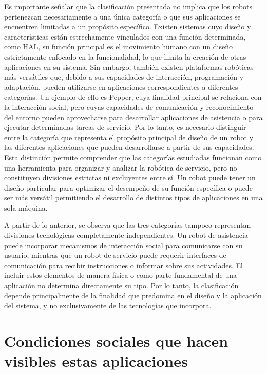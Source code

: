 \documentclass[11pt,a4paper]{article}
\begin{document}
Es importante señalar que la clasificación presentada no implica que los robots pertenezcan necesariamente a una única categoría o que sus aplicaciones se encuentren limitadas a un propósito específico. Existen sistemas cuyo diseño y características están estrechamente vinculados con una función determinada, como HAL, su función principal es el movimiento humano con un diseño estrictamente enfocado en la funcionalidad, lo que limita la creación de otras aplicaciones en su sistema.\cite{hal}  Sin embargo, también existen plataformas robóticas más versátiles que, debido a sus capacidades de interacción, programación y adaptación, pueden utilizarse en aplicaciones correspondientes a diferentes categorías. Un ejemplo de ello es Pepper, cuya finalidad principal se relaciona con la interacción social, pero cuyas capacidades de comunicación y reconocimiento del entorno pueden aprovecharse para desarrollar aplicaciones de asistencia o para ejecutar determinadas tareas de servicio.\cite{pepper}  Por lo tanto, es necesario distinguir entre la categoría que representa el propósito principal de diseño de un robot y las diferentes aplicaciones que pueden desarrollarse a partir de sus capacidades. Esta distinción permite comprender que las categorías estudiadas funcionan como una herramienta para organizar y analizar la robótica de servicio, pero no constituyen divisiones estrictas ni excluyentes entre sí. Un robot puede tener un diseño particular para optimizar el desempeño de su función específica o puede ser más versátil permitiendo el desarrollo de distintos tipos de aplicaciones en una sola máquina.

A partir de lo anterior, se observa que las tres categorías tampoco representan divisiones tecnológicas completamente independientes. Un robot de asistencia puede incorporar mecanismos de interacción social para comunicarse con su usuario, mientras que un robot de servicio puede requerir interfaces de comunicación para recibir instrucciones o informar sobre sus actividades. El incluir estos elementos de manera física o como parte fundamental de una aplicación no determina directamente su tipo. Por lo tanto, la clasificación depende principalmente de la finalidad que predomina en el diseño y la aplicación del sistema, y no exclusivamente de las tecnologías que incorpora.

\clearpage

\section{Condiciones sociales que hacen visibles estas aplicaciones}
\end{document}
